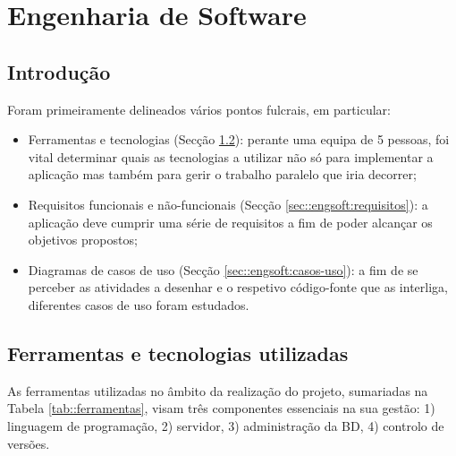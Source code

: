 \chapter{Engenharia de Software}
\label{ch::engsoft}


\section{Introdução}
\label{sec::engsoft:intro}

Foram primeiramente delineados vários pontos fulcrais, em particular:

\begin{itemize}
    \item Ferramentas e tecnologias (Secção \ref{sec::engsoft:tecnologia}): perante uma equipa de 5 pessoas, foi vital determinar quais as tecnologias a utilizar não só para implementar a aplicação mas também para gerir o trabalho paralelo que iria decorrer;
    \item Requisitos funcionais e não-funcionais (Secção \ref{sec::engsoft:requisitos}): a aplicação deve cumprir uma série de requisitos a fim de poder alcançar os objetivos propostos;
    \item Diagramas de casos de uso (Secção \ref{sec::engsoft:casos-uso}): a fim de se perceber as atividades a desenhar e o respetivo código-fonte que as interliga, diferentes casos de uso foram estudados.
\end{itemize}


\section{Ferramentas e tecnologias utilizadas}
\label{sec::engsoft:tecnologia}

As ferramentas utilizadas no âmbito da realização do projeto, sumariadas na Tabela \ref{tab::ferramentas}, visam três componentes essenciais na sua gestão: 1) linguagem de programação, 2) servidor, 3) administração da \acl{BD}, 4) controlo de versões.


